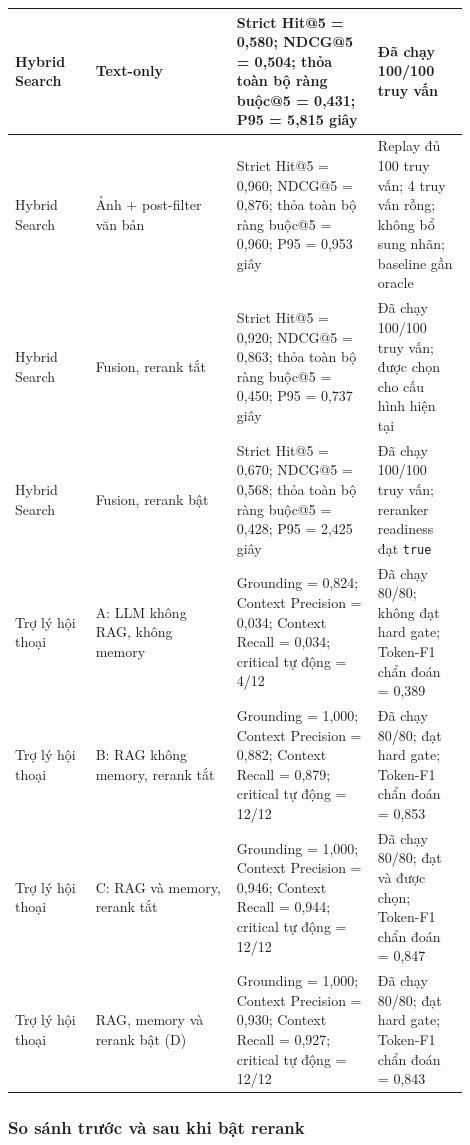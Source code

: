 \begin{longtable}{|p{0.16\linewidth}|p{0.28\linewidth}|p{0.28\linewidth}|p{0.18\linewidth}|}
Hybrid Search & Text-only & Strict Hit@5 = 0,580; NDCG@5 = 0,504; thỏa toàn bộ ràng buộc@5 = 0,431; P95 = 5,815 giây & Đã chạy 100/100 truy vấn \\ \hline
Hybrid Search & Ảnh + post-filter văn bản & Strict Hit@5 = 0,960; NDCG@5 = 0,876; thỏa toàn bộ ràng buộc@5 = 0,960; P95 = 0,953 giây & Replay đủ 100 truy vấn; 4 truy vấn rỗng; không bổ sung nhãn; baseline gần oracle \\ \hline
Hybrid Search & Fusion, rerank tắt & Strict Hit@5 = 0,920; NDCG@5 = 0,863; thỏa toàn bộ ràng buộc@5 = 0,450; P95 = 0,737 giây & Đã chạy 100/100 truy vấn; được chọn cho cấu hình hiện tại \\ \hline
Hybrid Search & Fusion, rerank bật & Strict Hit@5 = 0,670; NDCG@5 = 0,568; thỏa toàn bộ ràng buộc@5 = 0,428; P95 = 2,425 giây & Đã chạy 100/100 truy vấn; reranker readiness đạt \texttt{true} \\ \hline
Trợ lý hội thoại & A: LLM không RAG, không memory & Grounding = 0,824; Context Precision = 0,034; Context Recall = 0,034; critical tự động = 4/12 & Đã chạy 80/80; không đạt hard gate; Token-F1 chẩn đoán = 0,389 \\ \hline
Trợ lý hội thoại & B: RAG không memory, rerank tắt & Grounding = 1,000; Context Precision = 0,882; Context Recall = 0,879; critical tự động = 12/12 & Đã chạy 80/80; đạt hard gate; Token-F1 chẩn đoán = 0,853 \\ \hline
Trợ lý hội thoại & C: RAG và memory, rerank tắt & Grounding = 1,000; Context Precision = 0,946; Context Recall = 0,944; critical tự động = 12/12 & Đã chạy 80/80; đạt và được chọn; Token-F1 chẩn đoán = 0,847 \\ \hline
Trợ lý hội thoại & RAG, memory và rerank bật (D) & Grounding = 1,000; Context Precision = 0,930; Context Recall = 0,927; critical tự động = 12/12 & Đã chạy 80/80; đạt hard gate; Token-F1 chẩn đoán = 0,843 \\ \hline
\end{longtable}

\subsubsection{So sánh trước và sau khi bật rerank}

